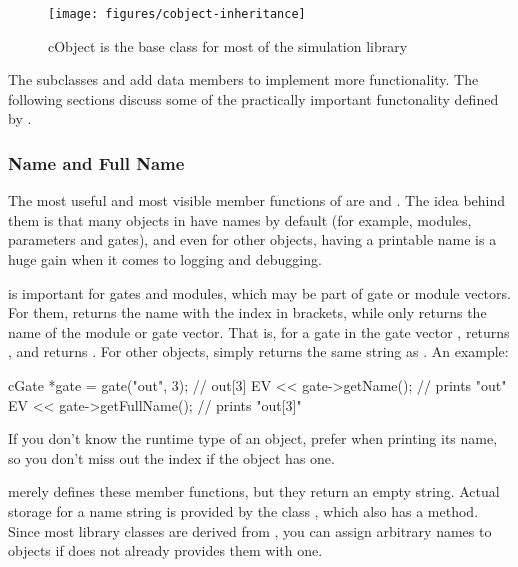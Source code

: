 \begin{figure}[htbp]
 \begin{center}
   \texttt{[image: figures/cobject-inheritance]}
   \caption{cObject is the base class for most of the simulation library}
  \end{center}
\end{figure}

The subclasses  and  add data
members to implement more functionality. The following sections discuss
some of the practically important functonality defined by .


\subsubsection{Name and Full Name}
\label{sec:sim-lib:name}

The most useful and most visible member functions of  are
 and . The idea behind them is that
many objects in {\opp} have names by default (for example, modules,
parameters and gates), and even for other objects, having a printable name
is a huge gain when it comes to logging and debugging.

 is important for gates and modules, which may be part
of gate or module vectors. For them,  returns the name
with the index in brackets, while  only returns the name
of the module or gate vector. That is, for a gate  in the gate
vector ,  returns , and
 returns . For other objects,
 simply returns the same string as .
An example:

\begin{cpp}
cGate *gate = gate("out", 3);  // out[3]
EV << gate->getName();  // prints "out"
EV << gate->getFullName();  // prints "out[3]"
\end{cpp}

\begin{note}
If you don't know the runtime type of an object, prefer 
when printing its name, so you don't miss out the index if the object has one.
\end{note}

 merely defines these member functions, but they return an
empty string. Actual storage for a name string is provided by the class
, which also has a  method. Since
most library classes are derived from , you can assign
arbitrary names to objects if {\opp} does not already provides them with
one.

